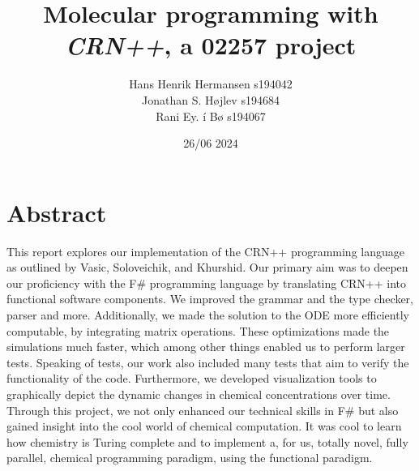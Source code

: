 \documentclass[11pt,a4paper]{article}
\title{Molecular programming with \textit{CRN++}, a 02257 project}
\author{
    Hans Henrik Hermansen s194042\\
    Jonathan S. Højlev s194684\\
    Rani Ey. í Bø s194067}
\date{26/06 2024}
\begin{document}

\maketitle
\section{Abstract}
This report explores our implementation of the CRN++ programming language as outlined by Vasic, Soloveichik, and Khurshid. Our primary aim was to deepen our proficiency with the F\# programming language by translating CRN++ into functional software components. We improved the grammar and the type checker, parser and more. Additionally, we made the solution to the ODE more efficiently computable, by integrating matrix operations. These optimizations made the simulations much faster, which among other things enabled us to perform larger tests. Speaking of tests, our work also included many tests that aim to verify the functionality of the code. Furthermore, we developed visualization tools to graphically depict the dynamic changes in chemical concentrations over time.\\

Through this project, we not only enhanced our technical skills in F\# but also gained insight into the cool world of chemical computation. It was cool to learn how chemistry is Turing complete and to implement a, for us, totally novel, fully parallel, chemical programming paradigm, using the functional paradigm.




\newpage







\newpage

\end{document}
